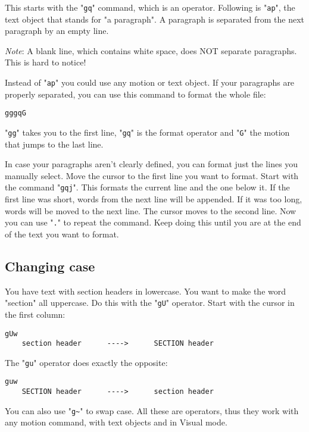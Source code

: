 This starts with the "\verb!gq!" command, which is an operator.
Following is "\verb!ap!", the text object that stands for "a paragraph".
A paragraph is separated from the next paragraph by an empty line.

\emph{Note}:
A blank line, which contains white space, does NOT separate paragraphs.
This is hard to notice!

Instead of "\verb!ap!" you could use any motion or text object.
If your paragraphs are properly separated, you can use this command to format the whole file:

\begin{Verbatim}[samepage=true]
 gggqG
\end{Verbatim}

"\verb!gg!" takes you to the first line, "\verb!gq!" is the format operator and "\verb!G!" the motion that jumps to the last line.

In case your paragraphs aren't clearly defined, you can format just the lines you manually select.
Move the cursor to the first line you want to format.
Start with the command "\verb!gqj!".
This formats the current line and the one below it.
If the first line was short, words from the next line will be appended.
If it was too long, words will be moved to the next line.
The cursor moves to the second line.
Now you can use "\verb!.!" to repeat the command.
Keep doing this until you are at the end of the text you want to format.

\subsection{Changing case}
You have text with section headers in lowercase.
You want to make the word "section" all uppercase.
Do this with the "\verb!gU!" operator.
Start with the cursor in the first column:

\begin{Verbatim}[samepage=true]
                         gUw
    section header      ---->      SECTION header
\end{Verbatim}

The "\verb!gu!" operator does exactly the opposite:

\begin{Verbatim}[samepage=true]
                         guw
    SECTION header      ---->      section header
\end{Verbatim}

You can also use "\verb!g~!" to swap case.
All these are operators, thus they work with any motion command, with text objects and in Visual mode.

